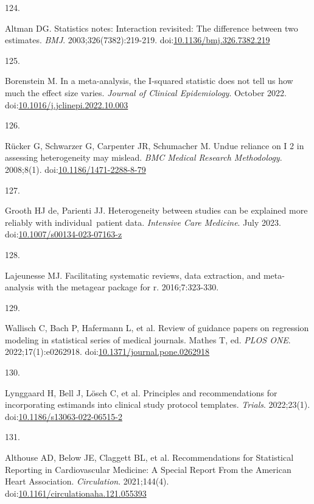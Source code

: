 \documentclass[
]{book}
\newlength{\cslhangindent}
\newlength{\csllabelwidth}
\newlength{\cslentryspacingunit} %
\newenvironment{CSLReferences}[2] %
 {%
  \setlength{\parindent}{0pt}
  \ifodd #1
  \let\oldpar\par
  \def\par{\hangindent=\cslhangindent\oldpar}
  \fi
  \setlength{\parskip}{#2\cslentryspacingunit}
 }%
 {}
\newcommand{\CSLLeftMargin}[1]{\parbox[t]{\csllabelwidth}{#1}}
\newcommand{\CSLRightInline}[1]{\parbox[t]{\linewidth - \csllabelwidth}{#1}\break}
\begin{document}
\begin{CSLReferences}{0}{0}
\leavevmode{}%
\CSLLeftMargin{124. }%
\CSLRightInline{Altman DG. Statistics notes: Interaction revisited: The difference between two estimates. \emph{BMJ}. 2003;326(7382):219-219. doi:\href{https://doi.org/10.1136/bmj.326.7382.219}{10.1136/bmj.326.7382.219}}

\leavevmode{}%
\CSLLeftMargin{125. }%
\CSLRightInline{Borenstein M. In a meta-analysis, the I-squared statistic does not tell us how much the effect size varies. \emph{Journal of Clinical Epidemiology}. October 2022. doi:\href{https://doi.org/10.1016/j.jclinepi.2022.10.003}{10.1016/j.jclinepi.2022.10.003}}

\leavevmode{}%
\CSLLeftMargin{126. }%
\CSLRightInline{Rücker G, Schwarzer G, Carpenter JR, Schumacher M. Undue reliance on I 2 in assessing heterogeneity may mislead. \emph{BMC Medical Research Methodology}. 2008;8(1). doi:\href{https://doi.org/10.1186/1471-2288-8-79}{10.1186/1471-2288-8-79}}

\leavevmode{}%
\CSLLeftMargin{127. }%
\CSLRightInline{Grooth HJ de, Parienti JJ. Heterogeneity between studies can be explained more reliably with individual~patient data. \emph{Intensive Care Medicine}. July 2023. doi:\href{https://doi.org/10.1007/s00134-023-07163-z}{10.1007/s00134-023-07163-z}}

\leavevmode{}%
\CSLLeftMargin{128. }%
\CSLRightInline{Lajeunesse MJ. Facilitating systematic reviews, data extraction, and meta-analysis with the metagear package for r. 2016;7:323-330.}

\leavevmode{}%
\CSLLeftMargin{129. }%
\CSLRightInline{Wallisch C, Bach P, Hafermann L, et al. Review of guidance papers on regression modeling in statistical series of medical journals. Mathes T, ed. \emph{PLOS ONE}. 2022;17(1):e0262918. doi:\href{https://doi.org/10.1371/journal.pone.0262918}{10.1371/journal.pone.0262918}}

\leavevmode{}%
\CSLLeftMargin{130. }%
\CSLRightInline{Lynggaard H, Bell J, Lösch C, et al. Principles and recommendations for incorporating estimands into clinical study protocol templates. \emph{Trials}. 2022;23(1). doi:\href{https://doi.org/10.1186/s13063-022-06515-2}{10.1186/s13063-022-06515-2}}

\leavevmode{}%
\CSLLeftMargin{131. }%
\CSLRightInline{Althouse AD, Below JE, Claggett BL, et al. Recommendations for Statistical Reporting in Cardiovascular Medicine: A Special Report From the American Heart Association. \emph{Circulation}. 2021;144(4). doi:\href{https://doi.org/10.1161/circulationaha.121.055393}{10.1161/circulationaha.121.055393}}


\end{CSLReferences}
\end{document}
